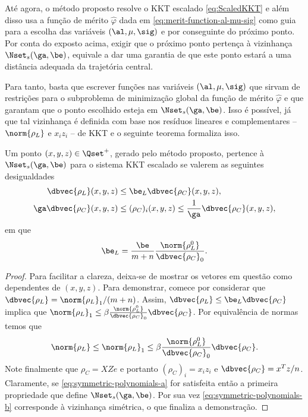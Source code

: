 Até agora, o método proposto resolve o \ac{KKT} escalado \eqref{eq:ScaledKKT}
e além disso usa a função de mérito $\hat{\varphi}$ dada em
\eqref{eq:merit-function-al-mu-sig} como guia para a escolha das variáveis
$(\al,\mu,\sig)$  e por conseguinte do próximo ponto. Por conta do exposto
acima, exigir que o próximo ponto pertença à vizinhança $\Nset_{s}(\ga,\be)$, equivale a dar 
uma garantia de que este ponto estará a uma  distância adequada da
trajetória central.

Para tanto, basta que escrever funções nas variáveis
$(\al,\mu,\sig)$ que sirvam de restrições para o subproblema de minimização global da
função de mérito $\hat{\varphi}$ e que garantam que o ponto escolhido esteja em 
$\Nset_{s}(\ga,\be)$. Isso é possível, já que tal vizinhança é definida com base
nos resíduos lineares e complementares -- $\norm{\rho_L}$ e $x_iz_i$ -- de
\ac{KKT} e o seguinte teorema formaliza isso.


\begin{teo} 
\label{thm:polynomial-constraints}
Um ponto $(x,y,z)\in\Qset^+$, gerado pelo método proposto, pertence à 
$\Nset_{s}(\ga,\be)$ para o sistema \ac{KKT} escalado se valerem as seguintes desigualdades 
\begin{subequations}
\label{eq:symmetric-polynomials}
\begin{align} 
 \dbvec{\rho_L}(x,y,z) & \leq \be_L \dbvec{\rho_C}(x,y,z),
 \label{eq:symmetric-polynomials-a}\\
 \ga\dbvec{\rho_C}(x,y,z) &\leq (\rho_C)_i(x,y,z) \leq
 \frac{1}{\ga}\dbvec{\rho_C}(x,y,z),
 \label{eq:symmetric-polynomials-b}
\end{align} 
\end{subequations}
em que \[\be_L = \frac{\be}{m+n}\frac{\norm{\rho_L^0}}{\dbvec{\rho_C}_0}.\]
\end{teo}



\begin{proof}Para facilitar a clareza, deixa-se de mostrar os vetores em
questão como dependentes de $(x,y,z)$. Para demonstrar, comece por
considerar que $\dbvec{\rho_L} = \norm{\rho_L}_1/(m+n)$.
Assim, $\dbvec{\rho_L}  \leq \be_L \dbvec{\rho_C}$ implica que 
$\norm{\rho_L}_1 \leq \beta \frac{\norm{\rho_L^0}}{\dbvec{\rho_C}_0}
\dbvec{\rho_C}$. 
Por equivalência de normas temos que 
\[
\norm{\rho_L} \leq \norm{\rho_L}_1 \leq \beta
\frac{\norm{\rho_L^0}}{\dbvec{\rho_C}_0} \dbvec{\rho_C}.
\] 
Note finalmente que $\rho_C = XZe$ e portanto $(\rho_C)_i = x_iz_i$ e
$\dbvec{\rho_C} = x^Tz/n$. Claramente, se  \eqref{eq:symmetric-polynomials-a}
for satisfeita então a primeira propriedade que define $\Nset_{s}(\ga,\be)$.
Por sua vez \eqref{eq:symmetric-polynomials-b} corresponde à vizinhança
simétrica, o que finaliza a demonstração.
\end{proof}



